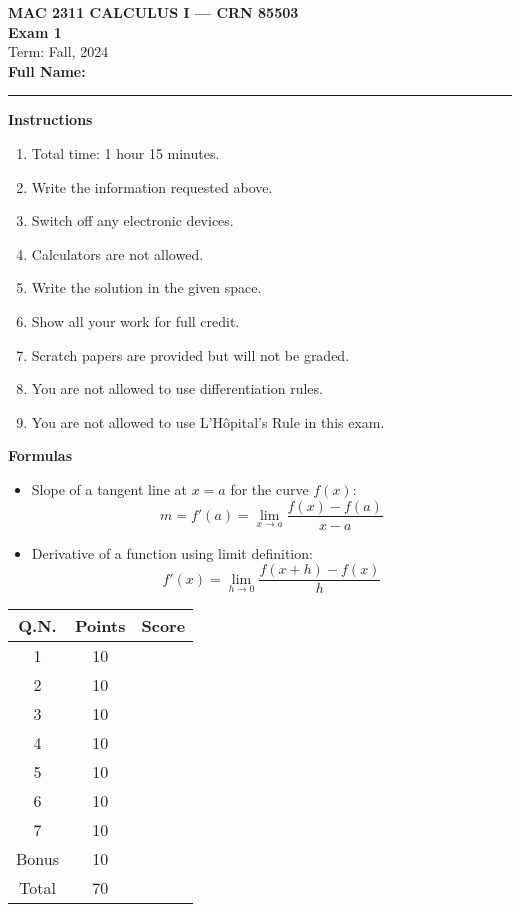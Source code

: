 \documentclass[12pt]{article}
\begin{document}
\begin{center}
    \textbf{\Large MAC 2311 CALCULUS I --- CRN 85503}\\
    \vspace{0.2cm}
    \textbf{\Large Exam 1}\\
    \vspace{0.2cm}
    Term: Fall, 2024 \\
    \vspace{0.2cm}
    \textbf{Full Name:} \rule{10cm}{0.5pt}
\end{center}

\vspace{0.5cm}

\textbf{Instructions}
\begin{enumerate}[label=\arabic*.]
    \item Total time: 1 hour 15 minutes.
    \item Write the information requested above.
    \item Switch off any electronic devices.
    \item Calculators are not allowed.
    \item Write the solution in the given space.
    \item Show all your work for full credit.
    \item Scratch papers are provided but will not be graded.
    \item You are not allowed to use differentiation rules.
    \item You are not allowed to use L’Hôpital’s Rule in this exam.
\end{enumerate}

\vspace{0.5cm}

\textbf{Formulas}
\begin{itemize}
    \item Slope of a tangent line at \( x = a \) for the curve \( f(x) \): \\
    \[ m = f'(a) = \lim_{x \to a} \frac{f(x) - f(a)}{x - a} \]

    \item Derivative of a function using limit definition: \\
    \[ f'(x) = \lim_{h \to 0} \frac{f(x + h) - f(x)}{h} \]
\end{itemize}

\vspace{0.5cm}

\begin{tabular}{|c|c|c|}
    \hline
    Q.N. & Points & Score \\
    \hline
    1 & 10 & \\
    2 & 10 & \\
    3 & 10 & \\
    4 & 10 & \\
    5 & 10 & \\
    6 & 10 & \\
    7 & 10 & \\
    Bonus & 10 & \\
    \hline
    Total & 70 & \\
    \hline
\end{tabular}
\end{document}
